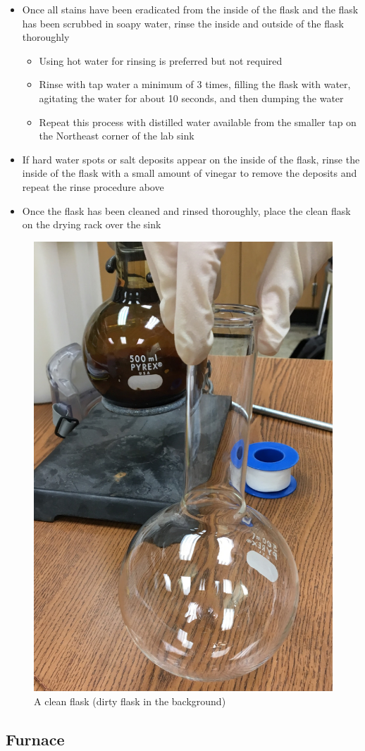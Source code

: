 \documentclass[letterpaper,11pt]{article}
\begin{document}
\begin{itemize}
\begin{itemize}
        \item Once all stains have been eradicated from the inside of the flask
            and the flask has been scrubbed in soapy water, rinse the inside and
            outside of the flask thoroughly
            \begin{itemize}
            \item Using hot water for rinsing is preferred but not required
            \item Rinse with tap water a minimum of 3 times, filling the flask
                with water, agitating the water for about 10 seconds, and then 
                dumping the water
            \item Repeat this process with distilled water available from the 
                smaller tap on the Northeast corner of the lab sink
            \end{itemize}
        
        \item If hard water spots or salt deposits appear on the inside of the 
            flask, rinse the inside of the flask with a small amount of vinegar
            to remove the deposits and repeat the rinse procedure above
        \item Once the flask has been cleaned and rinsed thoroughly, place the 
            clean flask on the drying rack over the sink
        \end{itemize}        
    \end{itemize}

\begin{figure}[H]
\centering
\includegraphics[width=.25\textwidth]{clean_dirty_flask.jpg}
\caption{A clean flask (dirty flask in the background)}
\label{fig:clean_dirty}
\end{figure}  

\newpage 
    \subsection{Furnace}
\end{document}
